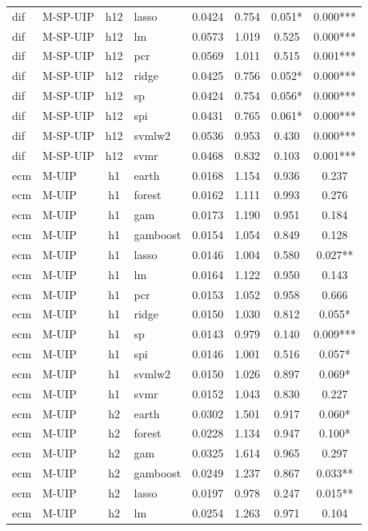 \begin{ThreePartTable}
\begin{longtable}[t]{llclcccc}
dif & M-SP-UIP & h12 & lasso & 0.0424 & 0.754 & 0.051* & 0.000***\\
dif & M-SP-UIP & h12 & lm & 0.0573 & 1.019 & 0.525 & 0.000***\\
dif & M-SP-UIP & h12 & pcr & 0.0569 & 1.011 & 0.515 & 0.001***\\
dif & M-SP-UIP & h12 & ridge & 0.0425 & 0.756 & 0.052* & 0.000***\\
dif & M-SP-UIP & h12 & sp & 0.0424 & 0.754 & 0.056* & 0.000***\\
dif & M-SP-UIP & h12 & spi & 0.0431 & 0.765 & 0.061* & 0.000***\\
dif & M-SP-UIP & h12 & svmlw2 & 0.0536 & 0.953 & 0.430 & 0.000***\\
dif & M-SP-UIP & h12 & svmr & 0.0468 & 0.832 & 0.103 & 0.001***\\
\addlinespace
ecm & M-UIP & h1 & earth & 0.0168 & 1.154 & 0.936 & 0.237\\
ecm & M-UIP & h1 & forest & 0.0162 & 1.111 & 0.993 & 0.276\\
ecm & M-UIP & h1 & gam & 0.0173 & 1.190 & 0.951 & 0.184\\
ecm & M-UIP & h1 & gamboost & 0.0154 & 1.054 & 0.849 & 0.128\\
ecm & M-UIP & h1 & lasso & 0.0146 & 1.004 & 0.580 & 0.027**\\
ecm & M-UIP & h1 & lm & 0.0164 & 1.122 & 0.950 & 0.143\\
ecm & M-UIP & h1 & pcr & 0.0153 & 1.052 & 0.958 & 0.666\\
ecm & M-UIP & h1 & ridge & 0.0150 & 1.030 & 0.812 & 0.055*\\
ecm & M-UIP & h1 & sp & 0.0143 & 0.979 & 0.140 & 0.009***\\
ecm & M-UIP & h1 & spi & 0.0146 & 1.001 & 0.516 & 0.057*\\
ecm & M-UIP & h1 & svmlw2 & 0.0150 & 1.026 & 0.897 & 0.069*\\
ecm & M-UIP & h1 & svmr & 0.0152 & 1.043 & 0.830 & 0.227\\
\addlinespace
ecm & M-UIP & h2 & earth & 0.0302 & 1.501 & 0.917 & 0.060*\\
ecm & M-UIP & h2 & forest & 0.0228 & 1.134 & 0.947 & 0.100*\\
ecm & M-UIP & h2 & gam & 0.0325 & 1.614 & 0.965 & 0.297\\
ecm & M-UIP & h2 & gamboost & 0.0249 & 1.237 & 0.867 & 0.033**\\
ecm & M-UIP & h2 & lasso & 0.0197 & 0.978 & 0.247 & 0.015**\\
ecm & M-UIP & h2 & lm & 0.0254 & 1.263 & 0.971 & 0.104\\

\end{longtable}
\end{ThreePartTable}

